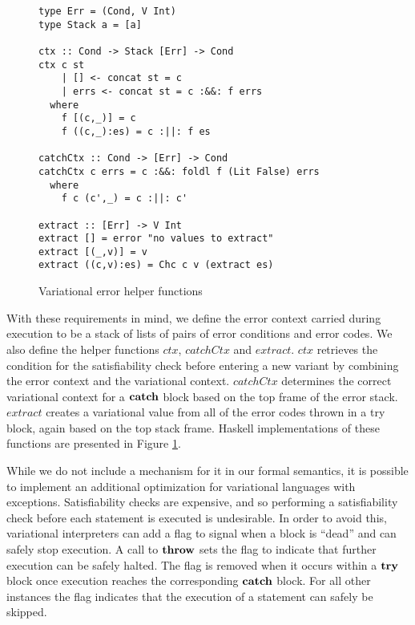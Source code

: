 \documentclass[12pt,oneside]{book}
\begin{document}
\begin{figure}
\begin{lstlisting}
type Err = (Cond, V Int)
type Stack a = [a]

ctx :: Cond -> Stack [Err] -> Cond
ctx c st
    | [] <- concat st = c
    | errs <- concat st = c :&&: f errs
  where
    f [(c,_)] = c
    f ((c,_):es) = c :||: f es
    
catchCtx :: Cond -> [Err] -> Cond
catchCtx c errs = c :&&: foldl f (Lit False) errs
  where
    f c (c',_) = c :||: c'
    
extract :: [Err] -> V Int
extract [] = error "no values to extract"
extract [(_,v)] = v
extract ((c,v):es) = Chc c v (extract es)
\end{lstlisting}
\caption{Variational error helper functions}
\label{fig:errhelpers}
\end{figure}


With these requirements in mind, we define the error context carried during execution to be a stack of lists of pairs of error conditions and error codes.
We also define the helper functions $\mathit{ctx}$, $\mathit{catchCtx}$ and $\mathit{extract}$. $\mathit{ctx}$ retrieves the condition for the satisfiability check
before entering a new variant by combining the error context and the variational context. $\mathit{catchCtx}$ determines the correct variational context for a $\textbf{\textup{\textrm{catch}}}$
block based on the top frame of the error stack. $\mathit{extract}$ creates a variational value from all of the error codes thrown in a try block, again based on the top stack frame. Haskell implementations of these functions are presented in Figure \ref{fig:errhelpers}.

While we do not include a mechanism for it in our formal semantics, it is possible to implement an additional optimization for variational languages with exceptions.
Satisfiability checks are expensive, and so performing a satisfiability check before each statement is executed is undesirable. In order to avoid this, variational interpreters
can add a flag to signal when a block is ``dead'' and can safely stop execution. A call to $\textbf{\textup{\textrm{throw}}}$ sets the flag to indicate that further execution can be safely halted.
The flag is removed when it occurs within a $\textbf{\textup{\textrm{try}}}$ block once execution reaches the corresponding $\textbf{\textup{\textrm{catch}}}$ block. For all other instances the flag indicates that
the execution of a statement can safely be skipped.
\end{document}
